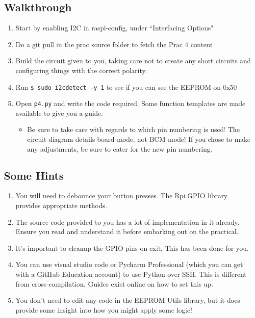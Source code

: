 \subsection{Walkthrough}
\begin{enumerate}
    \item Start by enabling I2C in raspi-config, under ``Interfacing Options"
    \item Do a git pull in the prac source folder to fetch the Prac 4 content
    \item Build the circuit given to you, taking care not to create any short circuits and configuring things with the correct polarity.
    \item Run \verb|$ sudo i2cdetect -y 1| to see if you can see the EEPROM  on 0x50
    \item Open \verb|p4.py| and write the code required. Some function templates are made available to give you a guide.
    \begin{itemize}
        \item Be sure to take care with regards to which pin numbering is used! The circuit diagram details board mode, not BCM mode! If you chose to make any adjustments, be sure to cater for the new pin numbering.
    \end{itemize}
\end{enumerate}

\subsection{Some Hints}
\begin{enumerate}
    \item You will need to debounce your button presses. The Rpi.GPIO library provides appropriate methods.
    \item The source code provided to you has a lot of implementation in it already. Ensure you read and understand it before embarking out on the practical.
    \item It's important to cleanup the GPIO pins on exit. This has been done for you.
    \item You can use visual studio code or Pycharm Professional (which you can get with a GitHub Education account) to use Python over SSH. This is different from cross-compilation. Guides exist online on how to set this up.
    \item You don't need to edit any code in the EEPROM Utils library, but it does provide some insight into how you might apply some logic! 
\end{enumerate}


